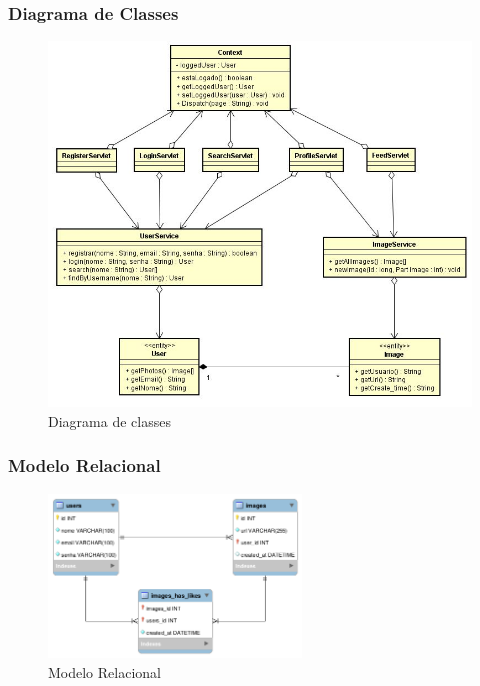 \pagebreak

\subsubsection{Diagrama de Classes}
\begin{figure}[ht]
	\centering
	\includegraphics[width=\textwidth]{./imagens/classdiagram.jpg}
	\caption{Diagrama de classes}
	\label{fig:diagramaDeClasse}
\end{figure}

\pagebreak

\subsubsection{Modelo Relacional} 
\begin{figure}[ht]
	\centering
	\includegraphics[width=0.6\textwidth]{./imagens/der.png}
	\caption{Modelo Relacional}
	\label{fig:modeloRelacional}
\end{figure}

